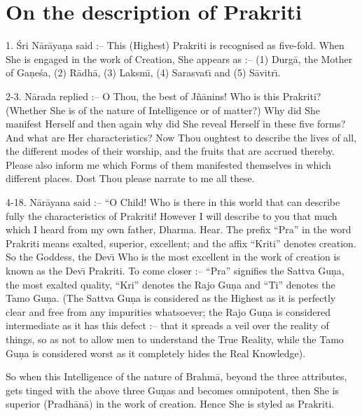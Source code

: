 \chapter{On the description of Prakriti}

1. \'Sri N\=ar\=aya\d{n}a said :-- This (Highest) Prakriti is recognised as five-fold. When She is engaged in the work of Creation, She appears as :-- (1) Durg\=a, the Mother of Ga\d{n}e\'sa, (2) R\=adh\=a, (3) Laksm\={\i}, (4) Sarasvat\={\i} and (5) S\=avitr\={\i}.

2-3. N\=arada replied :-- O Thou, the best of J\~n\=anins! Who is this Prakriti? (Whether She is of the nature of Intelligence or of matter?) Why did She manifest Herself and then again why did She reveal Herself in these five forms? And what are Her characteristics? Now Thou oughtest to describe the lives of all, the different modes of their worship, and the fruits that are accrued thereby. Please also inform me which Forms of them manifested themselves in which different places. Dost Thou please narrate to me all these.

4-18. N\=ar\=ayana said :-- ``O Child! Who is there in this world that can describe fully the characteristics of Prakriti! However I will describe to you that much which I heard from my own father, Dharma. Hear. The prefix ``Pra'' in the word Prakriti means exalted, superior, excellent; and the affix ``Kriti'' denotes creation. So the Goddess, the Dev\={\i} Who is the most excellent in the work of creation is known as the Dev\={\i} Prakriti. To come closer :-- ``Pra'' signifies the Sattva Gu\d{n}a, the most exalted quality, ``Kri'' denotes the Rajo Gu\d{n}a and ``Ti'' denotes the Tamo Gu\d{n}a. (The Sattva Gu\d{n}a is considered as the Highest as it is perfectly clear and free from any impurities whatsoever; the Rajo Gu\d{n}a is considered intermediate as it has this defect :-- that it spreads a veil over the reality of things, so as not to allow men to understand the True Reality, while the Tamo Gu\d{n}a is considered worst as it completely hides the Real Knowledge).

So when this Intelligence of the nature of Brahm\=a, beyond the three attributes, gets tinged with the above three Gu\d{n}as and becomes omnipotent, then She is superior (Pradh\=an\=a) in the work of creation. Hence She is styled as Prakriti.

